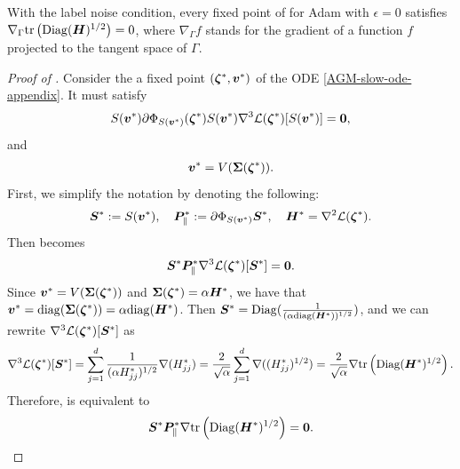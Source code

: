 \begin{lemma}[Adam's Implicit Bias under Label Noise and $\epsilon = 0$]
    With the label noise condition, every fixed point of  for Adam with $\epsilon = 0$ satisfies $\nabla_{\Gamma} \text{tr}\left(\mathrm{Diag}({\bm{H}})^{1/2}\right) = 0$, where $\nabla_{\Gamma} f$ stands for the
gradient of a function $f$ projected to the tangent space of $\Gamma$. 
    \label{thm:formal-adam-implicit-bias-label-noise-eps-0}
\end{lemma}
\begin{proof}[Proof of ]
    Consider the a fixed point  $({\bm{\zeta}}^*,{\bm{v}}^*)$ of the ODE \eqref{AGM-slow-ode-appendix}. It must satisfy
    \begin{align}
        S({\bm{v}}^*) \partial\Phi_{S({\bm{v}}^*)} ({\bm{\zeta}}^*) S({\bm{v}}^*) \nabla^3 \mathcal{L} ({\bm{\zeta}}^*)[S({\bm{v}}^*)]={\bm{0}}, \label{equ:constraint-for-Phi}
    \end{align}
    and 
    \begin{align}
        {\bm{v}}^* = V({\bm{\Sigma}}({\bm{\zeta}}^*)). \label{equ:constraint-for-v}
    \end{align}
    First, we simplify the notation by denoting the following:
    $${\bm{S}}^* := S({\bm{v}}^*), \quad {\bm{P}}^*_{\parallel}:=\partial \Phi_{S({\bm{v}}^*)}{\bm{S}}^*,  \quad {\bm{H}}^* = \nabla^2 \mathcal{L}({\bm{\zeta}}^*).$$
    Then  becomes
    \begin{align*}
        {\bm{S}}^* {\bm{P}}^*_{\parallel} \nabla^3 \mathcal{L} ({\bm{\zeta}}^*)[{\bm{S}}^*] = {\bm{0}}. 
    \end{align*}
    Since ${\bm{v}}^* = V({\bm{\Sigma}}({\bm{\zeta}}^*))$ and ${\bm{\Sigma}}({\bm{\zeta}}^*) = \alpha {\bm{H}}^*$, we have that ${\bm{v}}^* = \mathrm{diag}({\bm{\Sigma}}({\bm{\zeta}}^*)) = \alpha\mathrm{diag}({\bm{H}}^*)$.
    Then ${\bm{S}}^* = \mathrm{Diag}(\frac{1}{(\alpha\mathrm{diag}({\bm{H}}^*))^{1/2}})$, and we can rewrite $\nabla^3 \mathcal{L} ({\bm{\zeta}}^*)[{\bm{S}}^*]$ as
    \begin{align*}
        \nabla^3 \mathcal{L} ({\bm{\zeta}}^*)[{\bm{S}}^*] = \sum_{j=1}^{d} \frac{1}{(\alpha H^*_{jj})^{1/2}} \nabla(H^*_{jj}) = \frac{2}{\sqrt{\alpha}} \sum_{j=1}^{d} \nabla ((H^*_{jj})^{1/2}) = \frac{2}{\sqrt{\alpha}} \nabla \text{tr}\left(\mathrm{Diag}({\bm{H}}^*)^{1/2}\right).
    \end{align*}
Therefore,  is equivalent to
\begin{align*}
    {\bm{S}}^* {\bm{P}}^*_{\parallel}\nabla \text{tr}\left(\mathrm{Diag}({\bm{H}}^*)^{1/2}\right) = {\bm{0}}.
\end{align*}


\end{proof}
